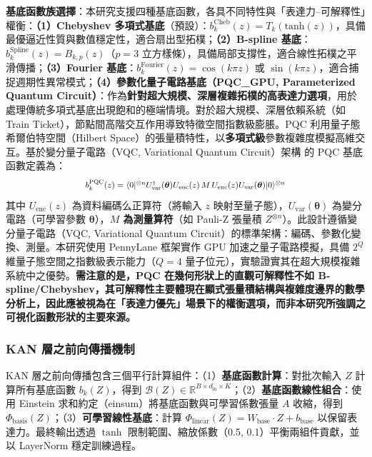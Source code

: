 \documentclass[10pt,a4paper,twocolumn]{article}
\begin{document}
\textbf{基底函數族選擇}：本研究支援四種基底函數，各具不同特性與「表達力–可解釋性」權衡：\textbf{（1）Chebyshev 多項式基底}（預設）：$b_k^{\text{Cheb}}(z) = T_k(\text{tanh}(z))$，具備最優逼近性質與數值穩定性，適合扇出型拓樸；\textbf{（2）B-spline 基底}：$b_k^{\text{Spline}}(z) = B_{k,p}(z)$（$p=3$ 立方樣條），具備局部支撐性，適合線性拓樸之平滑傳播；\textbf{（3）Fourier 基底}：$b_k^{\text{Fourier}}(z) = \cos(k \pi z)$ 或 $\sin(k \pi z)$，適合捕捉週期性異常模式；\textbf{（4）參數化量子電路基底（PQC\_GPU, Parameterized Quantum Circuit）}：作為\textbf{針對超大規模、深層複雜拓樸的高表達力選項}，用於處理傳統多項式基底出現飽和的極端情境。對於超大規模、深層依賴系統（如 Train Ticket），節點間高階交互作用導致特徵空間指數級膨脹。PQC 利用量子態希爾伯特空間（Hilbert Space）的張量積特性，以\textbf{多項式級}參數複雜度模擬高維交互。基於變分量子電路（VQC, Variational Quantum Circuit）架構 \cite{pennylane} 的 PQC 基底函數定義為：
\begin{equation}
\scalebox{0.85}{$b_k^{\text{PQC}}(z) = \langle 0|^{\otimes n} U^\dagger_{\text{var}}(\boldsymbol{\theta}) U_{\text{enc}}(z) \, M \, U_{\text{enc}}(z) U_{\text{var}}(\boldsymbol{\theta}) |0\rangle^{\otimes n}$}
\end{equation}
其中 $U_{\text{enc}}(z)$ 為資料編碼么正算符（將輸入 $z$ 映射至量子態），$U_{\text{var}}(\boldsymbol{\theta})$ 為變分電路（可學習參數 $\boldsymbol{\theta}$），\textbf{$M$ 為測量算符}（如 Pauli-Z 張量積 $Z^{\otimes n}$）。此設計遵循變分量子電路（VQC, Variational Quantum Circuit）的標準架構：編碼、參數化變換、測量。本研究使用 PennyLane 框架實作 GPU 加速之量子電路模擬，具備 $2^Q$ 維量子態空間之指數級表示能力（$Q=4$ 量子位元），實驗證實其在超大規模複雜系統中之優勢。\textbf{需注意的是，PQC 在幾何形狀上的直觀可解釋性不如 B-spline/Chebyshev，其可解釋性主要體現在顯式張量積結構與複雜度邊界的數學分析上，因此應被視為在「表達力優先」場景下的權衡選項，而非本研究所強調之可視化函數形狀的主要來源。}

\subsubsection{KAN 層之前向傳播機制}

KAN 層之前向傳播包含三個平行計算組件：（1）\textbf{基底函數計算}：對批次輸入 $Z$ 計算所有基底函數 $b_k(Z)$，得到 $\mathcal{B}(Z) \in \mathbb{R}^{B \times d_{\text{in}} \times K}$；（2）\textbf{基底函數線性組合}：使用 Einstein 求和約定（einsum）將基底函數與可學習係數張量 $A$ 收縮，得到 $\Phi_{\text{basis}}(Z)$；（3）\textbf{可學習線性基底}：計算 $\Phi_{\text{linear}}(Z) = W_{\text{base}} \cdot Z + b_{\text{base}}$ 以保留表達力。最終輸出透過 $\tanh$ 限制範圍、縮放係數（0.5, 0.1）平衡兩組件貢獻，並以 LayerNorm 穩定訓練過程。
\end{document}
